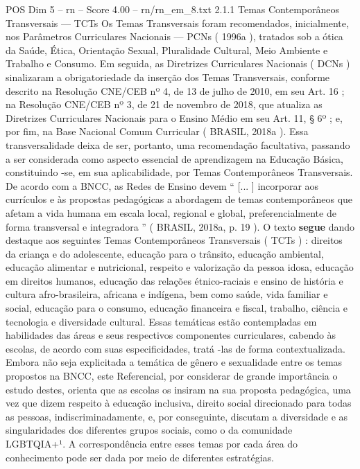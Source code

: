 \begin{textsample}{POS Dim 5 – rn – Score 4.00 – rn/rn\_em\_8.txt}  \label{ex:f5_pos_150}
2.1.1 Temas Contemporâneos Transversais — TCTs Os Temas Transversais foram recomendados, inicialmente, nos Parâmetros Curriculares Nacionais — PCNs ( 1996a ), tratados sob a ótica da Saúde, Ética, Orientação Sexual, Pluralidade Cultural, Meio Ambiente e Trabalho e Consumo.
Em seguida, as Diretrizes Curriculares Nacionais ( DCNs ) sinalizaram a obrigatoriedade da inserção dos Temas Transversais, conforme descrito na Resolução CNE/CEB nº 4, de 13 de julho de 2010, em seu Art. 16 ; na Resolução CNE/CEB nº 3, de 21 de novembro de 2018, que atualiza as Diretrizes Curriculares Nacionais para o Ensino Médio em seu Art. 11, § 6º ; e, por fim, na Base Nacional Comum Curricular ( BRASIL, 2018a ).
Essa transversalidade deixa de ser, portanto, uma recomendação facultativa, passando a ser considerada como aspecto essencial de aprendizagem na Educação Básica, constituindo -se, em sua aplicabilidade, por Temas Contemporâneos Transversais.
De acordo com a BNCC, as Redes de Ensino devem “ [... ] incorporar aos currículos e às propostas pedagógicas a abordagem de temas contemporâneos que afetam a vida humana em escala local, regional e global, preferencialmente de forma transversal e integradora ” ( BRASIL, 2018a, p. 19 ).
O texto \textbf{segue} dando destaque aos seguintes Temas Contemporâneos Transversais ( TCTs ) : direitos da criança e do adolescente, educação para o trânsito, educação ambiental, educação alimentar e nutricional, respeito e valorização da pessoa idosa, educação em direitos humanos, educação das relações étnico-raciais e ensino de história e cultura afro-brasileira, africana e indígena, bem como saúde, vida familiar e social, educação para o consumo, educação financeira e fiscal, trabalho, ciência e tecnologia e diversidade cultural.
Essas temáticas estão contempladas em habilidades das áreas e seus respectivos componentes curriculares, cabendo às escolas, de acordo com suas especificidades, tratá -las de forma contextualizada.
Embora não seja explicitada a temática de gênero e sexualidade entre os temas propostos na BNCC, este Referencial, por considerar de grande importância o estudo destes, orienta que as escolas os insiram na sua proposta pedagógica, uma vez que dizem respeito à educação inclusiva, direito social direcionado para todas as pessoas, indiscriminadamente, e, por conseguinte, discutam a diversidade e as singularidades dos diferentes grupos sociais, como o da comunidade LGBTQIA+¹.
A correspondência entre esses temas por cada área do conhecimento pode ser dada por meio de diferentes estratégias.

\end{textsample}
